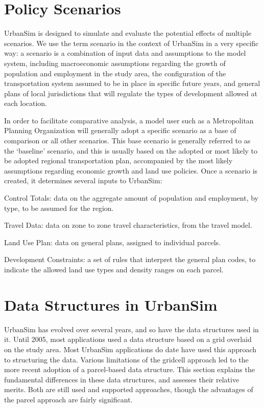 \section{Policy Scenarios}

UrbanSim is designed to simulate and evaluate the potential effects of multiple scenarios.  We use the term scenario in the context of UrbanSim in a very
specific way: a scenario is a combination of input data and assumptions to the model system, including macroeconomic assumptions regarding the growth of population and employment in the study area, the configuration of the transportation system assumed to be in place in specific future years, and
general plans of local jurisdictions that will regulate the types of development allowed at each location.

In order to facilitate comparative analysis, a model user such as a Metropolitan Planning Organization will generally adopt a specific scenario as a base of comparison or all other scenarios.  This base scenario is generally referred to as the `baseline' scenario, and this is usually based on the adopted or most
likely to be adopted regional transportation plan, accompanied by the most likely assumptions regarding economic growth and land use policies.  Once a  scenario is created, it determines several inputs to UrbanSim:

\squishlist
\item Control Totals: data on the aggregate amount of population and employment, by type, to be assumed for the region.
\item Travel Data: data on zone to zone travel characteristics, from the travel model.
\item Land Use Plan: data on general plans, assigned to individual parcels.
\item Development Constraints: a set of rules that interpret the general plan codes, to indicate the allowed land use types and density ranges on each parcel.
\squishend

\section{Data Structures in UrbanSim}
UrbanSim has evolved over several years, and so have the data structures used in it.  Until 2005, most applications used a data structure based on a grid overlaid on the study area.  Most UrbanSim applications do date have used this approach to structuring the data.  Various limitations of the gridcell approach led to the more recent adoption of a parcel-based data structure.  This section explains the fundamental differences in these data structures, and assesses their relative merits.  Both are still used and supported approaches, though the advantages of the parcel approach are fairly significant.

